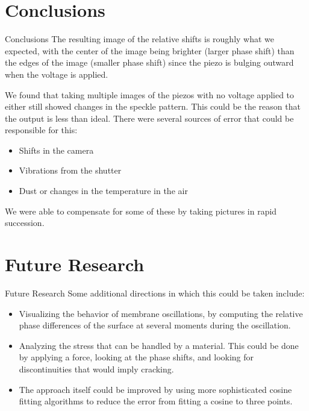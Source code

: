 \documentclass[pdf]{beamer}
\begin{document}
\section{Conclusions}
\begin{frame}{Conclusions}
The resulting image of the relative shifts is roughly what we expected, with the center of the image being brighter (larger phase shift) than the edges of the image (smaller phase shift) since the piezo is bulging outward when the voltage is applied.

\vspace{0.3cm}
We found that taking multiple images of the piezos with no voltage applied to either still showed changes in the speckle pattern. This could be the reason that the output is less than ideal. There were several sources of error that could be responsible for this:
\begin{itemize}
	\item Shifts in the camera
	\item Vibrations from the shutter
	\item Dust or changes in the temperature in the air
\end{itemize}
We were able to compensate for some of these by taking pictures in rapid succession.
\end{frame}

\section{Future Research}
\begin{frame}{Future Research}
Some additional directions in which this could be taken include:
\begin{itemize}
\item{Visualizing the behavior of membrane oscillations, by computing the relative phase differences of the surface at several moments during the oscillation.}
\item{Analyzing the stress that can be handled by a material. This could be done by applying a force, looking at the phase shifts, and looking for discontinuities that would imply cracking.}
\item{The approach itself could be improved by using more sophisticated cosine fitting algorithms to reduce the error from fitting a cosine to three points.}
\end{itemize}
\end{frame}
\end{document}
